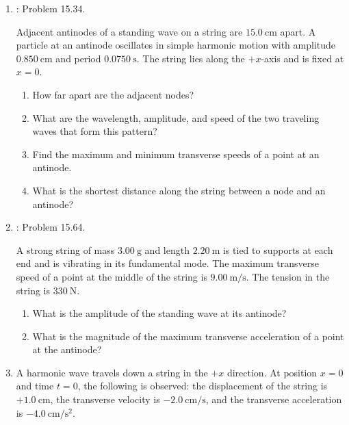 \documentclass[../psets.tex]{subfiles}
\begin{document}
\begin{enumerate}[label={\arabic*)}]
\begin{center}
    \end{center}
    \item \textcite{bib:YoungFreedman}: Problem 15.34.\par
    Adjacent antinodes of a standing wave on a string are $\SI{15.0}{\centi\meter}$ apart. A particle at an antinode oscillates in simple harmonic motion with amplitude $\SI{0.850}{\centi\meter}$ and period $\SI{0.0750}{\second}$. The string lies along the $+x$-axis and is fixed at $x=0$.
    \begin{enumerate}
        \item How far apart are the adjacent nodes?
        \item What are the wavelength, amplitude, and speed of the two traveling waves that form this pattern?
        \item Find the maximum and minimum transverse speeds of a point at an antinode.
        \item What is the shortest distance along the string between a node and an antinode?
    \end{enumerate}
    \item \textcite{bib:YoungFreedman}: Problem 15.64.\par
    A strong string of mass $\SI{3.00}{\gram}$ and length $\SI{2.20}{\meter}$ is tied to supports at each end and is vibrating in its fundamental mode. The maximum transverse speed of a point at the middle of the string is $\SI{9.00}{\meter\per\second}$. The tension in the string is $\SI{330}{\newton}$.
    \begin{enumerate}
        \item What is the amplitude of the standing wave at its antinode?
        \item What is the magnitude of the maximum transverse acceleration of a point at the antinode?
    \end{enumerate}
    \item A harmonic wave travels down a string in the $+x$ direction. At position $x=0$ and time $t=0$, the following is observed: the displacement of the string is $+\SI{1.0}{\centi\meter}$, the transverse velocity is $-\SI{2.0}{\centi\meter\per\second}$, and the transverse acceleration is $-\SI{4.0}{\centi\meter\per\square\second}$.

\end{enumerate}
\end{document}

